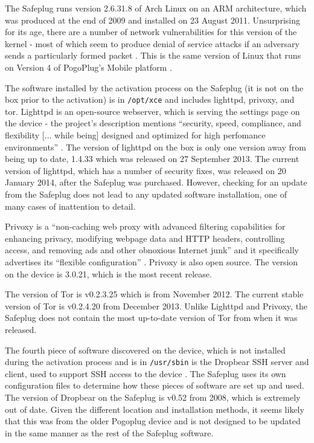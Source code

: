 \documentclass[conference]{IEEEtran}
\begin{document}
The Safeplug runs version 2.6.31.8 of Arch Linux on an ARM architecture, which was produced at the end of 2009 and installed on 23 August 2011.  Unsurprising for its age, there are a number of network vulnerabilities for this version of the kernel - most of which seem to produce denial of service attacks if an adversary sends a particularly formed packet \cite{kernelcve}.  This is the same version of Linux that runs on Version 4 of PogoPlug's Mobile platform \cite{archforum}.

The software installed by the activation process on the Safeplug (it is not on the box prior to the activation) is in \verb!/opt/xce! and includes lighttpd, privoxy, and tor.  Lighttpd is an open-source webserver, which is serving the settings page on the device - the project's description mentions ``security, speed, compliance, and flexibility [... while being] designed and optimized for high perfomance environments'' \cite{lighttpd}.  The version of lighttpd on the box is only one version away from being up to date, 1.4.33 which was released on 27 September 2013.  The current version of lighttpd, which has a number of security fixes, was released on 20 January 2014, after the Safeplug was purchased.  However, checking for an update from the Safeplug does not lead to any updated software installation, one of many cases of inattention to detail.

Privoxy is a ``non-caching web proxy with advanced filtering capabilities for enhancing privacy, modifying webpage data and HTTP headers, controlling access, and removing ads and other obnoxious Internet junk'' and it specifically advertises its ``flexible configuration'' \cite{privoxy}.  Privoxy is also open source.  The version on the device is 3.0.21, which is the most recent release.

The version of Tor is v0.2.3.25 which is from November 2012.  The current stable version of Tor is v0.2.4.20 from December 2013.  Unlike Lighttpd and Privoxy, the Safeplug does not contain the most up-to-date version of Tor from when it was released.

The fourth piece of software discovered on the device, which is not installed during the activation process and is in \verb!/usr/sbin! is the Dropbear SSH server and client, used to support SSH access to the device \cite{dropbear}.  The Safeplug uses its own configuration files to determine how these pieces of software are set up and used.  The version of Dropbear on the Safeplug is v0.52 from 2008, which is extremely out of date.  Given the different location and installation methods, it seems likely that this was from the older Pogoplug device and is not designed to be updated in the same manner as the rest of the Safeplug software.
\end{document}
